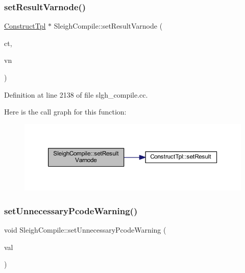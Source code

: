 \subsubsection{\texorpdfstring{setResultVarnode()}{setResultVarnode()}}
{\footnotesize\ttfamily \mbox{\hyperlink{class_construct_tpl}{Construct\+Tpl}} $\ast$ Sleigh\+Compile\+::set\+Result\+Varnode (\begin{DoxyParamCaption}\item[{\mbox{\hyperlink{class_construct_tpl}{Construct\+Tpl}} $\ast$}]{ct,  }\item[{\mbox{\hyperlink{class_varnode_tpl}{Varnode\+Tpl}} $\ast$}]{vn }\end{DoxyParamCaption})}



Definition at line 2138 of file slgh\+\_\+compile.\+cc.

Here is the call graph for this function\+:
\nopagebreak
\begin{figure}[H]
\begin{center}
\leavevmode
\includegraphics[width=350pt]{class_sleigh_compile_a4faccf9bdca5d00e52a51ad46ce6de91_cgraph}
\end{center}
\end{figure}
\mbox{\label{class_sleigh_compile_aea70d98ce950acdc4530ffdf5a6a2f31}} 
\subsubsection{\texorpdfstring{setUnnecessaryPcodeWarning()}{setUnnecessaryPcodeWarning()}}
{\footnotesize\ttfamily void Sleigh\+Compile\+::set\+Unnecessary\+Pcode\+Warning (\begin{DoxyParamCaption}\item[{bool}]{val }\end{DoxyParamCaption})\hspace{0.3cm}{\ttfamily [inline]}}



